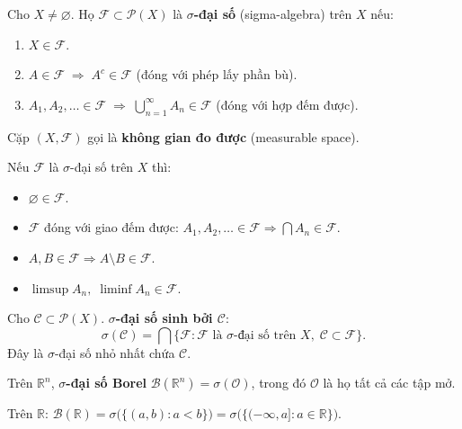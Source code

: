 \documentclass[12pt,a4paper]{article}
\begin{document}
\begin{dinhnghia}
  Cho $X \ne \varnothing$. Họ $\mathcal{F} \subset \mathcal{P}(X)$ là \textbf{$\sigma$-đại số} (sigma-algebra) trên $X$ nếu:
  \begin{enumerate}
    \item $X \in \mathcal{F}$.
    \item $A \in \mathcal{F} \;\Rightarrow\; A^c \in \mathcal{F}$ (đóng với phép lấy phần bù).
    \item $A_1, A_2, \ldots \in \mathcal{F} \;\Rightarrow\; \displaystyle\bigcup_{n=1}^{\infty} A_n \in \mathcal{F}$ (đóng với hợp đếm được).
  \end{enumerate}
  Cặp $(X, \mathcal{F})$ gọi là \textbf{không gian đo được} (measurable space).
\end{dinhnghia}

\begin{tinhchat}
  Nếu $\mathcal{F}$ là $\sigma$-đại số trên $X$ thì:
  \begin{itemize}
    \item $\varnothing \in \mathcal{F}$.
    \item $\mathcal{F}$ đóng với giao đếm được: $A_1, A_2, \ldots \in \mathcal{F} \Rightarrow \bigcap A_n \in \mathcal{F}$.
    \item $A, B \in \mathcal{F} \Rightarrow A \setminus B \in \mathcal{F}$.
    \item $\limsup A_n,\; \liminf A_n \in \mathcal{F}$.
  \end{itemize}
\end{tinhchat}

\begin{dinhnghia}[title={$\sigma$-đại số sinh bởi họ tập}]
  Cho $\mathcal{C} \subset \mathcal{P}(X)$. \textbf{$\sigma$-đại số sinh bởi $\mathcal{C}$}:
  \[
    \sigma(\mathcal{C}) = \bigcap\bigl\{\mathcal{F} : \mathcal{F} \text{ là } \sigma\text{-đại số trên } X,\; \mathcal{C} \subset \mathcal{F}\bigr\}.
  \]
  Đây là $\sigma$-đại số nhỏ nhất chứa $\mathcal{C}$.
\end{dinhnghia}

\begin{dinhnghia}[title={$\sigma$-đại số Borel}]
  Trên $\mathbb{R}^n$, \textbf{$\sigma$-đại số Borel} $\mathcal{B}(\mathbb{R}^n) = \sigma(\mathcal{O})$, trong đó $\mathcal{O}$ là họ tất cả các tập mở.

  Trên $\mathbb{R}$: $\mathcal{B}(\mathbb{R}) = \sigma\bigl(\{(a, b) : a < b\}\bigr) = \sigma\bigl(\{(-\infty, a] : a \in \mathbb{R}\}\bigr)$.
\end{dinhnghia}
\end{document}
